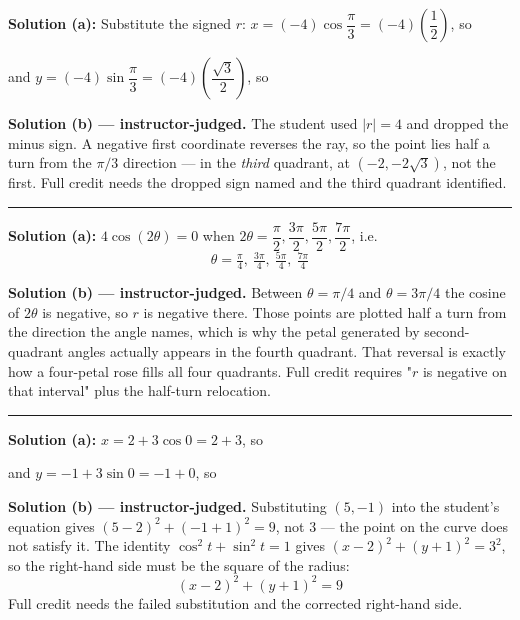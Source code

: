 \documentclass[12pt]{article}
\begin{document}

\textbf{Solution (a):} \quad Substitute the signed $r$:
$x = (-4)\cos\dfrac{\pi}{3} = (-4)\left(\dfrac{1}{2}\right)$, so 

and $y = (-4)\sin\dfrac{\pi}{3} = (-4)\left(\dfrac{\sqrt{3}}{2}\right)$, so 

\textbf{Solution (b) --- instructor-judged.} \quad The student used $|r| = 4$ and dropped the
minus sign. A negative first coordinate reverses the ray, so the point lies half a turn from
the $\pi/3$ direction --- in the \emph{third} quadrant, at $(-2, -2\sqrt{3})$, not the first.
Full credit needs the dropped sign named and the third quadrant identified.

\vspace{0.15cm}\noindent\rule{\linewidth}{0.2pt}\vspace{0.15cm}

\problem{A student claims $r = 4\cos(2\theta)$ never has $r < 0$. \ (a) Find every $\theta$ in
$[0, 2\pi)$ with $r = 0$. \ (b) Explain what happens between the first two of them.}

\textbf{Solution (a):} \quad $4\cos(2\theta) = 0$ when $2\theta = \dfrac{\pi}{2}, \dfrac{3\pi}{2},
\dfrac{5\pi}{2}, \dfrac{7\pi}{2}$, i.e.
\[ \boxed{\theta = \tfrac{\pi}{4}, \ \tfrac{3\pi}{4}, \ \tfrac{5\pi}{4}, \ \tfrac{7\pi}{4}} \]

\textbf{Solution (b) --- instructor-judged.} \quad Between $\theta = \pi/4$ and $\theta = 3\pi/4$
the cosine of $2\theta$ is negative, so $r$ is negative there. Those points are plotted half a
turn from the direction the angle names, which is why the petal generated by second-quadrant
angles actually appears in the fourth quadrant. That reversal is exactly how a four-petal rose
fills all four quadrants. Full credit requires "$r$ is negative on that interval" plus the
half-turn relocation.

\vspace{0.15cm}\noindent\rule{\linewidth}{0.2pt}\vspace{0.15cm}


\textbf{Solution (a):} \quad $x = 2 + 3\cos 0 = 2 + 3$, so 

and $y = -1 + 3\sin 0 = -1 + 0$, so 

\textbf{Solution (b) --- instructor-judged.} \quad Substituting $(5, -1)$ into the student's
equation gives $(5-2)^2 + (-1+1)^2 = 9$, not $3$ --- the point on the curve does not satisfy it.
The identity $\cos^2 t + \sin^2 t = 1$ gives $(x-2)^2 + (y+1)^2 = 3^2$, so the right-hand side
must be the square of the radius:
\[ \boxed{(x-2)^2 + (y+1)^2 = 9} \]
Full credit needs the failed substitution and the corrected right-hand side.
\end{document}

